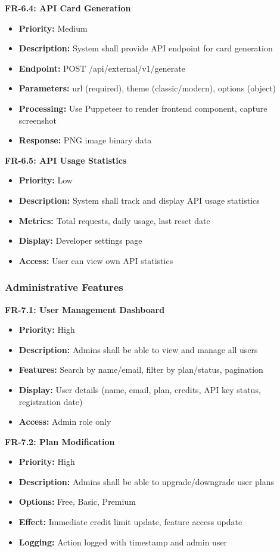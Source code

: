 \documentclass[12pt,a4paper]{article}
\begin{document}
\textbf{FR-6.4: API Card Generation}
\begin{itemize}
    \item \textbf{Priority:} Medium
    \item \textbf{Description:} System shall provide API endpoint for card generation
    \item \textbf{Endpoint:} POST /api/external/v1/generate
    \item \textbf{Parameters:} url (required), theme (classic/modern), options (object)
    \item \textbf{Processing:} Use Puppeteer to render frontend component, capture screenshot
    \item \textbf{Response:} PNG image binary data
\end{itemize}

\textbf{FR-6.5: API Usage Statistics}
\begin{itemize}
    \item \textbf{Priority:} Low
    \item \textbf{Description:} System shall track and display API usage statistics
    \item \textbf{Metrics:} Total requests, daily usage, last reset date
    \item \textbf{Display:} Developer settings page
    \item \textbf{Access:} User can view own API statistics
\end{itemize}

\subsubsection{Administrative Features}

\textbf{FR-7.1: User Management Dashboard}
\begin{itemize}
    \item \textbf{Priority:} High
    \item \textbf{Description:} Admins shall be able to view and manage all users
    \item \textbf{Features:} Search by name/email, filter by plan/status, pagination
    \item \textbf{Display:} User details (name, email, plan, credits, API key status, registration date)
    \item \textbf{Access:} Admin role only
\end{itemize}

\textbf{FR-7.2: Plan Modification}
\begin{itemize}
    \item \textbf{Priority:} High
    \item \textbf{Description:} Admins shall be able to upgrade/downgrade user plans
    \item \textbf{Options:} Free, Basic, Premium
    \item \textbf{Effect:} Immediate credit limit update, feature access update
    \item \textbf{Logging:} Action logged with timestamp and admin user
\end{itemize}
\end{document}
